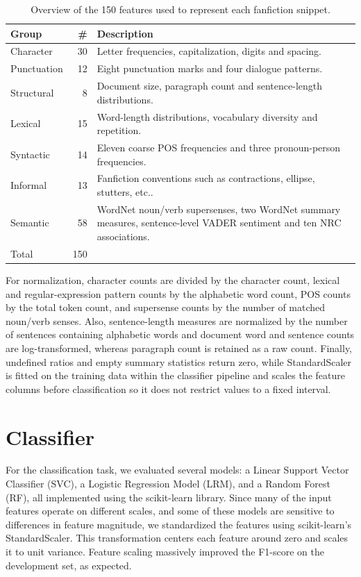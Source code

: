 \documentclass[11pt,twocolumn]{article}
\begin{document}
\begin{table}[ht]
    \centering
    \small
    \caption{Overview of the 150 features used to represent each fanfiction snippet.}
    \label{tab:features}
    \begin{tabularx}{\columnwidth}{@{}lr>{\raggedright\arraybackslash}X@{}}
        \toprule
        Group & \# & Description \\
        \midrule
        Character   & 30 & Letter frequencies, capitalization, digits and spacing. \\
        Punctuation & 12 & Eight punctuation marks and four dialogue patterns. \\
        Structural  &  8 & Document size, paragraph count and sentence-length distributions. \\
        Lexical     & 15 & Word-length distributions, vocabulary diversity and repetition. \\
        Syntactic   & 14 & Eleven coarse POS frequencies and three pronoun-person frequencies. \\
        Informal    & 13 & Fanfiction conventions such as contractions, ellipse, stutters, etc..\\
        Semantic    & 58 & WordNet noun/verb supersenses, two WordNet summary measures, sentence-level VADER sentiment and ten NRC associations. \\
        \midrule
        Total       & 150 & \\
        \bottomrule
    \end{tabularx}
\end{table}

For normalization, character counts are divided by the character count, lexical and regular-expression pattern counts by the alphabetic word count, POS counts by the total token count, and supersense counts by the number of matched noun/verb senses. Also, sentence-length measures are normalized by the number of sentences containing alphabetic words and document word and sentence counts are log-transformed, whereas paragraph count is retained as a raw count. Finally, undefined ratios and empty summary statistics return zero, while StandardScaler is fitted on the training data within the classifier pipeline and scales the feature columns before classification so it does not restrict values to a fixed interval.

\section{Classifier}
For the classification task, we evaluated several models: a Linear Support Vector Classifier (SVC), a Logistic Regression Model (LRM), and a Random Forest (RF), all implemented using the scikit-learn library. Since many of the input features operate on different scales, and some of these models are sensitive to differences in feature magnitude, we standardized the features using scikit-learn's StandardScaler. This transformation centers each feature around zero and scales it to unit variance. Feature scaling massively improved the F1-score on the development set, as expected.
\end{document}
